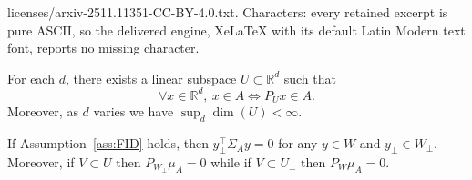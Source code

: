 \documentclass[10pt,a4paper]{amsart}
\newcommand{\R}{\mathbb{R}}
\begin{document}
licenses/arxiv-2511.11351-CC-BY-4.0.txt. Characters: every retained excerpt is pure ASCII, so the delivered engine, XeLaTeX with its default Latin Modern text font, reports no missing character.
\begin{assumption} \label{ass:FID}
	For each $d$, there exists a linear subspace $U \subset \R^d$ such that
	\begin{equation} \label{eq:FID}
		\forall x \in \R^d, \ x \in A \Leftrightarrow P_{U} x \in A.
	\end{equation}
	Moreover, as $d$ varies we have $\sup_d \dim(U) < \infty$.
\end{assumption}

\begin{lemma} \label{lemma:Sigma-A-mu-A-W}
	If Assumption~\ref{ass:FID} holds, then $y_\perp^\top \Sigma_A y = 0$ for any $y \in W$ and $y_\perp \in W_\perp$. Moreover, if $V \subset U$ then $P_{W_\perp} \mu_A = 0$ while if $V \subset U_\perp$ then $P_W \mu_A = 0$.
\end{lemma}
\end{document}
